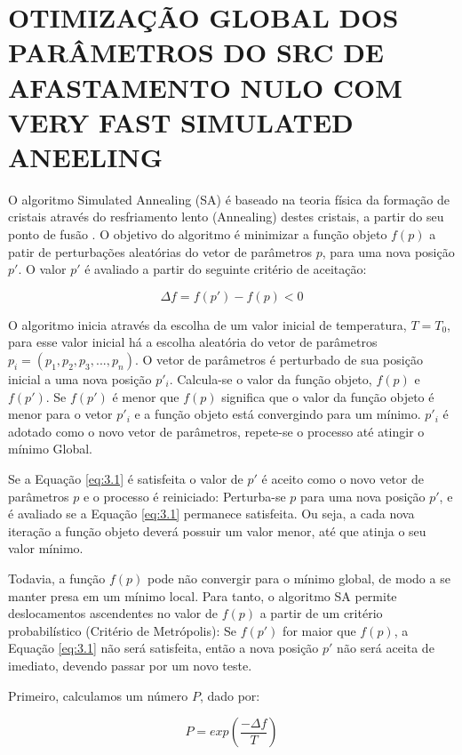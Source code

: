 \chapter{OTIMIZAÇÃO GLOBAL DOS PARÂMETROS DO SRC DE AFASTAMENTO NULO COM VERY FAST SIMULATED ANEELING}
\label{cap3}

O algoritmo Simulated Annealing (SA) é baseado na teoria física da formação de cristais
através do resfriamento lento (Annealing) destes cristais, a partir do seu ponto de fusão \cite{ingber}.
O objetivo do algoritmo é minimizar a função objeto $f(p)$ a patir de perturbações aleatórias do vetor de parâmetros $p$,
para uma nova posição $p'$. O valor $p'$ é avaliado a partir do seguinte critério de aceitação:

\begin{equation}
\label{eq:3.1}
 \Delta f=f(p')-f(p) < 0
\end{equation}

O algoritmo inicia através da escolha de um valor inicial de temperatura, $T=T_0$, para esse valor inicial há
a escolha aleatória do vetor de parâmetros $p_i=(p_1,p_2,p_3,...,p_n)$. O vetor de parâmetros é perturbado 
de sua posição inicial a uma nova posição $p'_i$. Calcula-se o valor da função objeto, $f(p)$ e $f(p')$. Se $f(p')$ é
menor que $f(p)$ significa que o valor da função objeto é menor para o vetor $p'_i$
e a função objeto está convergindo para um mínimo. $p'_i$ é adotado como o
novo vetor de parâmetros, repete-se o processo até atingir o mínimo Global.

Se a Equação \ref{eq:3.1} é satisfeita o valor de $p'$ é aceito como o novo vetor de parâmetros $p$ e o processo
é reiniciado: Perturba-se $p$ para uma nova posição $p'$, e é avaliado se a Equação \ref{eq:3.1} permanece satisfeita. 
Ou seja, a cada nova
iteração a função objeto deverá possuir um valor menor, até que atinja o seu valor mínimo.

Todavia, a função $f(p)$ pode não convergir para o mínimo global, de modo a se manter presa
em um mínimo local. Para tanto, o algoritmo SA permite deslocamentos ascendentes no valor de $f(p)$ a partir de um critério
probabilístico (Critério de Metrópolis): Se $f(p')$ for maior que $f(p)$, a Equação \ref{eq:3.1} não será satisfeita, então
a nova posição $p'$ não será aceita de imediato, devendo passar por um novo teste.

Primeiro, calculamos um número $P$, dado por:

\begin{equation}
\label{eq:3.2}
 P=exp(\frac{-\Delta f}{T})
\end{equation}

